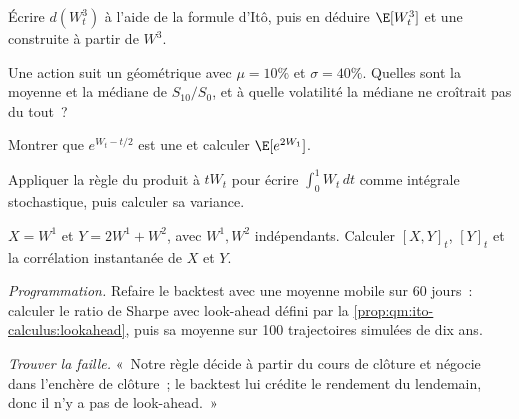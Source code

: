 \begin{exercise}[$\star$]\label{exo:qm:ito-calculus:2}
Écrire $d(W_t^3)$ à l'aide de la formule d'Itô, puis en déduire $\E[W_t^3]$ et une  construite à partir de $W^3$.
\end{exercise}

\begin{exercise}[$\star$]\label{exo:qm:ito-calculus:3}
Une action suit un  géométrique avec $\mu = 10\%$ et $\sigma = 40\%$. Quelles sont la moyenne
et la médiane de $S_{10}/S_0$, et à quelle volatilité la médiane ne croîtrait pas du tout~?
\end{exercise}

\begin{exercise}[$\star\star$]\label{exo:qm:ito-calculus:4}
Montrer que $e^{W_t - t/2}$ est une  et calculer $\E[e^{2W_1}]$.
\end{exercise}

\begin{exercise}[$\star\star$]\label{exo:qm:ito-calculus:5}
Appliquer la règle du produit à $tW_t$ pour écrire $\int_0^1 W_t\,dt$ comme intégrale stochastique, puis calculer
sa variance.
\end{exercise}

\begin{exercise}[$\star\star$]\label{exo:qm:ito-calculus:6}
$X = W^1$ et $Y = 2W^1 + W^2$, avec $W^1, W^2$ indépendants. Calculer $[X, Y]_t$, $[Y]_t$ et la
corrélation instantanée de $X$ et $Y$.
\end{exercise}

\begin{exercise}[$\star\star\star$]\label{exo:qm:ito-calculus:7}
\emph{Programmation.} Refaire le backtest avec une moyenne mobile sur 60 jours~: calculer le ratio de Sharpe
avec look-ahead défini par la \cref{prop:qm:ito-calculus:lookahead}, puis sa moyenne sur 100 trajectoires simulées de dix ans.
\end{exercise}

\begin{exercise}[$\star\star\star$]\label{exo:qm:ito-calculus:8}
\emph{Trouver la faille.} «~Notre règle décide à partir du cours de clôture et négocie
dans l'enchère de clôture~; le backtest lui crédite le rendement du lendemain, donc il n'y a pas de look-ahead.~»
\end{exercise}

